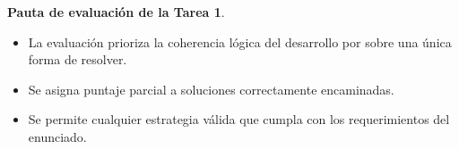 \item \textbf{Pauta de evaluación de la Tarea 1}.

\begin{tcolorbox}[colback=blue!2!white,colframe=blue!55!black,title={Criterios generales}]
\begin{itemize}
    \item La evaluación prioriza la coherencia lógica del desarrollo por sobre una única forma de resolver.
    \item Se asigna puntaje parcial a soluciones correctamente encaminadas.
    \item Se permite cualquier estrategia válida que cumpla con los requerimientos del enunciado.
\end{itemize}
\end{tcolorbox}

